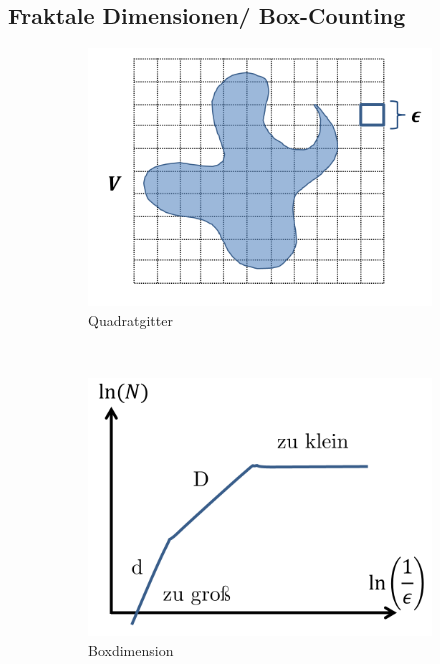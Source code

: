 \documentclass[12pt]{article}
\begin{document}
\subsection*{Fraktale Dimensionen/ Box-Counting}

\begin{figure}[h] 
		\begin{subfigure}[h]{0.5 \textwidth}
		\centering
		\includegraphics[width=\textwidth]{Folie68.png}
		\caption{Quadratgitter} 
		\label{fig:Quadratgitter}
		\centering
	\end{subfigure}
	~
\begin{subfigure}[h]{0.5\textwidth}
		\centering
		\includegraphics[width=\textwidth]{Folie69.png}
		\caption{Boxdimension}
		\label{fig:Boxdimension}
		\centering
	\end{subfigure}
	\caption{}
\end{figure}	
\end{document}

